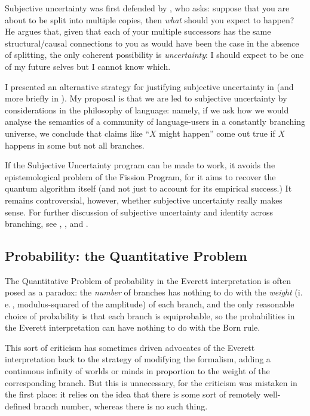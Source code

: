 \documentclass[12pt]{article}
\newcommand{\iec}{\mbox{i.\,e.\,}}
\begin{document}
Subjective uncertainty was first defended by , who asks: suppose that you are about to be split into multiple copies, then \emph{what} should you expect to happen? He argues that, given that each of your multiple successors has the same structural/causal connections to you as would have been the case in the absence of splitting, the only coherent possibility is \emph{uncertainty}: I should expect to be one of my future selves but I cannot know which. 

I presented an alternative strategy for justifying subjective uncertainty in  (and more briefly in ). My proposal is that we are led to subjective uncertainty by considerations in the philosophy of language: namely, if we ask how we would analyse the semantics of a community of language-users in a constantly branching universe, we conclude that claims like ``$X$ might happen'' come out true if $X$ happens in some but not all branches.

If the Subjective Uncertainty program can be made to work, it avoids the epistemological problem of the Fission Program,  for it aims to recover the quantum algorithm itself  (and not just to account for its empirical success.)  It remains controversial, however, whether subjective uncertainty really makes sense. For further discussion of subjective uncertainty and identity across branching, see , ,   and  .

\subsection{Probability: the Quantitative Problem}\label{DMWWprobabilityquantitative}

The Quantitative Problem of probability in the Everett interpretation is often posed as a paradox: the \emph{number} of branches has nothing to do with the \emph{weight} (\iec, modulus-squared of the amplitude) of each branch, and the only reasonable choice of probability is that each branch is equiprobable, so the probabilities in the Everett interpretation can have nothing to do with the Born rule.  

This sort of criticism has sometimes driven advocates of the Everett interpretation back to the strategy of modifying the formalism, adding a continuous infinity of worlds \cite{deutsch85} or minds \cite{albertloewermm,lockwoodbook}  in proportion to the weight of the corresponding branch. But this is unnecessary, for the criticism was mistaken in the first place: it relies on the idea that there is some sort of remotely well-defined branch number, whereas there is no such thing.
\end{document}
